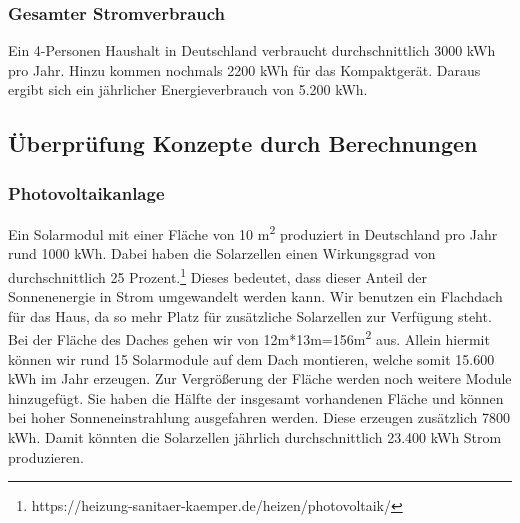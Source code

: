 \subsubsection{Gesamter Stromverbrauch}
Ein 4-Personen Haushalt in Deutschland verbraucht durchschnittlich 3000 kWh pro Jahr. Hinzu kommen nochmals 2200 kWh für das Kompaktgerät. Daraus ergibt sich ein jährlicher Energieverbrauch von 5.200 kWh.
\newpage

\subsection{Überprüfung Konzepte durch Berechnungen}
\subsubsection{Photovoltaikanlage}
Ein Solarmodul mit einer Fläche von 10 m\textsuperscript{2} produziert in Deutschland pro Jahr rund
1000 kWh. Dabei haben die Solarzellen einen Wirkungsgrad von durchschnittlich 25 Prozent.\footnote{https://heizung-sanitaer-kaemper.de/heizen/photovoltaik/} Dieses bedeutet, dass dieser Anteil der Sonnenenergie in Strom umgewandelt werden kann. Wir benutzen ein Flachdach für das Haus, da so mehr Platz für
zusätzliche Solarzellen zur Verfügung steht. Bei der Fläche des Daches gehen wir von
12m*13m=156m\textsuperscript{2} aus. Allein hiermit können wir rund 15 Solarmodule auf dem Dach montieren, welche somit 15.600 kWh im Jahr erzeugen. Zur Vergrößerung der Fläche werden noch weitere Module hinzugefügt. Sie haben die Hälfte der insgesamt vorhandenen Fläche und können bei hoher Sonneneinstrahlung ausgefahren werden. Diese erzeugen zusätzlich 7800 kWh. Damit könnten die Solarzellen jährlich durchschnittlich 23.400 kWh Strom produzieren.
 
